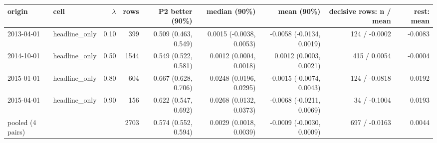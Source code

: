 \begin{tabular}{llrrrrrrr}
\toprule
origin & cell & $\lambda$ & rows & P2 better (90\%) & median (90\%) & mean (90\%) & decisive rows: n / mean & rest: mean \\
\midrule
2013-04-01 & headline\_only & 0.10 & 399 & 0.509 (0.463, 0.549) & 0.0015 (-0.0038, 0.0053) & -0.0058 (-0.0134, 0.0019) & 124 / -0.0002 & -0.0083 \\
2014-10-01 & headline\_only & 0.50 & 1544 & 0.549 (0.522, 0.581) & 0.0012 (0.0004, 0.0018) & 0.0012 (0.0003, 0.0021) & 415 / 0.0054 & -0.0004 \\
2015-01-01 & headline\_only & 0.80 & 604 & 0.667 (0.628, 0.706) & 0.0248 (0.0196, 0.0295) & -0.0015 (-0.0074, 0.0043) & 124 / -0.0818 & 0.0192 \\
2015-04-01 & headline\_only & 0.90 & 156 & 0.622 (0.547, 0.692) & 0.0268 (0.0132, 0.0373) & -0.0068 (-0.0211, 0.0069) & 34 / -0.1004 & 0.0193 \\
\midrule
pooled (4 pairs) &  &  & 2703 & 0.574 (0.552, 0.594) & 0.0029 (0.0018, 0.0039) & -0.0009 (-0.0030, 0.0009) & 697 / -0.0163 & 0.0044 \\
\bottomrule
\end{tabular}
